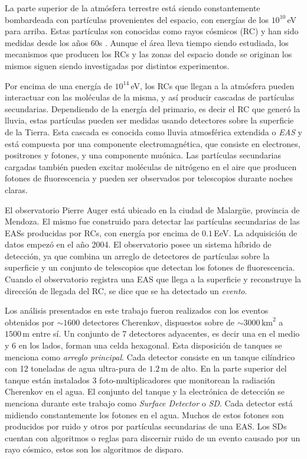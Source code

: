 
La parte superior de la atmósfera terrestre está siendo constantemente bombardeada con partículas provenientes del espacio, con energías de los $10^{10}\,$eV para arriba. Estas partículas son conocidas como rayos cósmicos (RC) y han sido medidas desde los años 60s \cite{linsley1961extremely}. Aunque el área lleva tiempo siendo estudiada, los mecanismos que producen los RCs y las zonas del espacio donde se originan los mismos siguen siendo investigadas por distintos experimentos. 


Por encima de una energía de $10^{14}\,$eV, los RCs que llegan a la atmósfera pueden interactuar con las moléculas de la misma,  y así producir cascadas de partículas secundarias. Dependiendo de la energía del primario, es decir el RC que generó la lluvia, estas partículas pueden ser medidas usando detectores sobre la superficie de la Tierra. Esta cascada es conocida como lluvia atmosférica extendida o \emph{EAS} y está compuesta por una componente electromagnética, que consiste en electrones, positrones y fotones, y una componente muónica. Las partículas secundarias cargadas también pueden excitar moléculas de nitrógeno en el aire que producen fotones de fluorescencia y pueden ser observados por telescopios durante noches claras.


El observatorio Pierre Auger está ubicado en la ciudad de Malargüe, provincia de Mendoza. El mismo fue construido para detectar las partículas secundarias de las EASs producidas por RCs, con energía por encima de $0.1\,$EeV. La adquisición de datos empezó en el año 2004. El observatorio posee un sistema híbrido de detección, ya que combina un arreglo de detectores de partículas sobre la superficie y un conjunto de telescopios que detectan los fotones de fluorescencia. Cuando el observatorio  registra una EAS que llega a la superficie y reconstruye la dirección de llegada del RC, se dice que se ha detectado un \textit{evento}.


Los análisis presentados en este trabajo fueron realizados con los eventos obtenidos por $\sim 1600$ detectores Cherenkov, dispuestos sobre de $\sim 3000\,\text{km}^2$ a  $1500\,$m entre sí. Un conjunto de 7 detectores adyacentes, es decir una en el medio y 6 en los lados, forman una celda hexagonal. Esta disposición de tanques se menciona como \textit{arreglo principal}.   Cada detector consiste en un tanque cilíndrico con 12 toneladas de agua ultra-pura de $1.2\,$m de alto. En la parte superior del tanque están instalados 3 foto-multiplicadores que monitorean la radiación Cherenkov en el agua. El conjunto del tanque y la electrónica de detección  se menciona durante este trabajo como \textit{Surface Detector} o \textit{SD}.  Cada detector está midiendo constantemente los fotones en el agua. Muchos de estos fotones son producidos por ruido y otros por partículas secundarias de una EAS. Los SDs cuentan con algoritmos o reglas para discernir ruido de un evento causado por un rayo cósmico, estos son los algoritmos de disparo.



